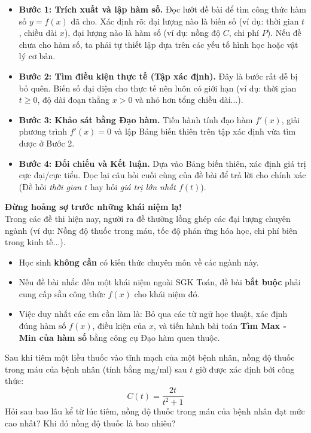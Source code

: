 \documentclass[12pt]{article}
\begin{document}
	\begin{itemize}[label=$\bullet$]
		\item \textbf{Bước 1: Trích xuất và lập hàm số.} Đọc lướt đề bài để tìm công thức hàm số $y = f(x)$ đã cho. Xác định rõ: đại lượng nào là biến số (ví dụ: thời gian $t$, chiều dài $x$), đại lượng nào là hàm số (ví dụ: nồng độ $C$, chi phí $P$). Nếu đề chưa cho hàm số, ta phải tự thiết lập dựa trên các yếu tố hình học hoặc vật lý cơ bản.
		\item \textbf{Bước 2: Tìm điều kiện thực tế (Tập xác định).} Đây là bước rất dễ bị bỏ quên. Biến số đại diện cho thực tế nên luôn có giới hạn (ví dụ: thời gian $t \ge 0$, độ dài đoạn thẳng $x > 0$ và nhỏ hơn tổng chiều dài...).
		\item \textbf{Bước 3: Khảo sát bằng Đạo hàm.} Tiến hành tính đạo hàm $f'(x)$, giải phương trình $f'(x)=0$ và lập Bảng biến thiên trên tập xác định vừa tìm được ở Bước 2.
		\item \textbf{Bước 4: Đối chiếu và Kết luận.} Dựa vào Bảng biến thiên, xác định giá trị cực đại/cực tiểu. Đọc lại câu hỏi cuối cùng của đề bài để trả lời cho chính xác (Đề hỏi \textit{thời gian $t$} hay hỏi \textit{giá trị lớn nhất $f(t)$}).
	\end{itemize}
	
	\begin{luuy}
		\textbf{Đừng hoảng sợ trước những khái niệm lạ!} \\
		Trong các đề thi hiện nay, người ra đề thường lồng ghép các đại lượng chuyên ngành (ví dụ: Nồng độ thuốc trong máu, tốc độ phản ứng hóa học, chi phí biên trong kinh tế...). 
		\begin{itemize}
			\item Học sinh \textbf{không cần} có kiến thức chuyên môn về các ngành này.
			\item Nếu đề bài nhắc đến một khái niệm ngoài SGK Toán, đề bài \textbf{bắt buộc} phải cung cấp sẵn công thức $f(x)$ cho khái niệm đó.
			\item Việc duy nhất các em cần làm là: Bỏ qua các từ ngữ học thuật, xác định đúng hàm số $f(x)$, điều kiện của $x$, và tiến hành bài toán \textbf{Tìm Max - Min của hàm số} bằng công cụ Đạo hàm quen thuộc.
		\end{itemize}
	\end{luuy}
	
	\begin{vidu}[2]
		Sau khi tiêm một liều thuốc vào tĩnh mạch của một bệnh nhân, nồng độ thuốc trong máu của bệnh nhân (tính bằng mg/ml) sau $t$ giờ được xác định bởi công thức:
		\[ C(t) = \frac{2t}{t^2 + 1} \]
		Hỏi sau bao lâu kể từ lúc tiêm, nồng độ thuốc trong máu của bệnh nhân đạt mức cao nhất? Khi đó nồng độ thuốc là bao nhiêu?
	\end{vidu}
	
\end{document}

